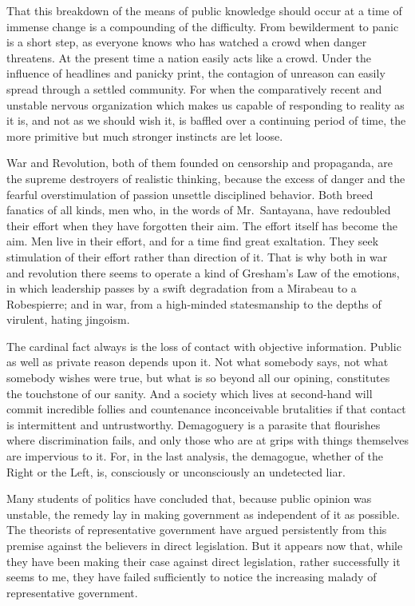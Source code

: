 \documentclass[openany,nobib,nohyper]{tufte-book}
\begin{document}
That this breakdown of the means of public knowledge should occur at a
time of immense change is a compounding of the difficulty. From
bewilderment to panic is a short step, as everyone knows who has watched
a crowd when danger threatens. At the present time a nation easily acts
like a crowd. Under the influence of headlines and panicky print, the
contagion of unreason can easily spread through a settled community. For
when the comparatively recent and unstable nervous organization which
makes us capable of responding to reality as it is, and not as we should
wish it, is baffled over a continuing period of time, the more primitive
but much stronger instincts are let loose.

War and Revolution, both of them founded on censorship and propaganda,
are the supreme destroyers of realistic thinking, because the excess of
danger and the fearful overstimulation of passion unsettle disciplined
behavior. Both breed fanatics of all kinds, men who, in the words of
Mr.~Santayana, have redoubled their effort when they have forgotten
their aim. The effort itself has become the aim. Men live in their
effort, and for a time find great exaltation. They seek stimulation of
their effort rather than direction of it. That is why both in war and
revolution there seems to operate a kind of Gresham's Law of the
emotions, in which leadership passes by a swift degradation from a
Mirabeau to a Robespierre; and in war, from a high-minded statesmanship
to the depths of virulent, hating jingoism.

The cardinal fact always is the loss of contact with objective
information. Public as well as private reason depends upon it. Not what
somebody says, not what somebody wishes were true, but what is so beyond
all our opining, constitutes the touchstone of our sanity. And a society
which lives at second-hand will commit incredible follies and
countenance inconceivable brutalities if that contact is intermittent
and untrustworthy. Demagoguery is a parasite that flourishes where
discrimination fails, and only those who are at grips with things
themselves are impervious to it. For, in the last analysis, the
demagogue, whether of the Right or the Left, is, consciously or
unconsciously an undetected liar.

Many students of politics have concluded that, because public opinion
was unstable, the remedy lay in making government as independent of it
as possible. The theorists of representative government have argued
persistently from this premise against the believers in direct
legislation. But it appears now that, while they have been making their
case against direct legislation, rather successfully it seems to me,
they have failed sufficiently to notice the increasing malady of
representative government.
\end{document}
